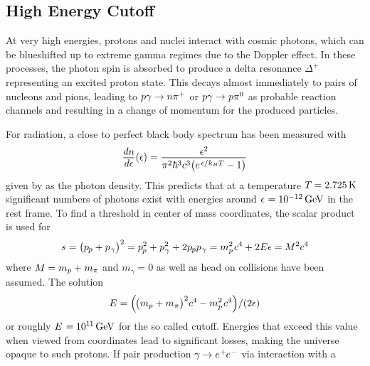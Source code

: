 \subsection{High Energy Cutoff}
\label{sub:cutoff}

At very high energies, protons and nuclei interact with cosmic photons, which can be blueshifted up to extreme gamma regimes due to
the Doppler effect. In these processes, the photon spin is absorbed to produce a delta resonance $\Delta^+$ representing an excited
proton state. This decays almost immediately to pairs of nucleons and pions, leading to $p\gamma \rightarrow \kern-0.1pt n\smash{\pi^+}$
or $p\gamma \rightarrow \kern+0.2pt p \smash{\pi^0}$ as probable reaction channels and resulting in a change of momentum for the
produced particles.

For  radiation, a close to perfect black body spectrum has been measured with
\begin{equation*}
	\frac{\raisebox{-0.3ex}{$dn$}}{\raisebox{0.15ex}{$d\epsilon$}} (\epsilon) \kern+0.2pt =
	\frac{\raisebox{-0.3ex}{$\epsilon^2$}}{\pi^2 \hbar^3 c^3 \bigl( e^{\kern+1.0pt \epsilon / k_B T} - 1 \bigr)}
\end{equation*}
given by \cite{Gaisser_2016} as the photon density. This predicts that at a temperature $T \kern-0.5pt = \qty{2.725}{\kelvin}$
significant numbers of photons exist with energies around $\epsilon \kern+0.5pt = \qty{e-12}{\giga\electronvolt}$
in the  rest frame. To find a threshold in center of mass coordinates, the scalar product is used for
\begin{equation*}
	s \kern+0.3pt = \bigl( p_{\kern-0.5pt p} + p_{\kern+0.5pt \gamma} \bigr)^2 =
	p_{\kern-0.5pt p}^2 + p_{\kern+0.5pt \gamma}^2 + 2 p_{\kern-0.5pt p} p_{\kern+0.5pt \gamma} =
	m_p^2 \kern+0.8pt c^4 \kern-0.2pt + 2 E \epsilon = \kern-0.2pt M^2c^4
\end{equation*}
where $M \kern-0.3pt = m_p + \kern+0.3pt m_\pi$ and $m_\gamma = 0$ as well as head on collisions have been assumed. The solution
\begin{equation*}
	E = \Bigl( \kern-1.0pt \bigl( m_p + m_\pi \bigr)^2 c^4 \kern-0.2pt - m_p^2 \kern+0.8pt c^4 \Bigr) / (2\epsilon)
\end{equation*}
or roughly $E \kern+1.0pt = \kern-0.5pt 10^{1 \kern-0.3pt 1} \kern+1.5pt \unit{\giga\electronvolt}$ for the so called 
cutoff. Energies that exceed this value when viewed from  coordinates lead to significant losses, making the universe
opaque to such protons. If pair production $\gamma \kern-0.5pt \rightarrow \smash{e^+ \kern-0.5pt e^-}$ via interaction with a
